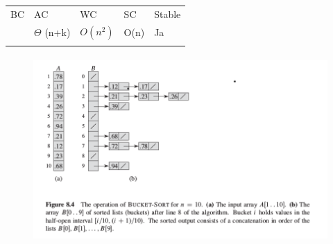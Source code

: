 \documentclass[12pt]{report}
\begin{document}
\begin{table}[H]
 			\centering
\begin{tabular}{p{1.36in}p{1.35in}p{1.07in}p{0.87in}p{1.03in}}
\hline
\multicolumn{1}{p{1.36in}}{{\fontsize{13pt}{15.6pt}\selectfont BC}} & 
\multicolumn{1}{p{1.35in}}{{\fontsize{13pt}{15.6pt}\selectfont AC}} & 
\multicolumn{1}{p{1.07in}}{{\fontsize{13pt}{15.6pt}\selectfont WC}} & 
\multicolumn{1}{p{0.87in}}{{\fontsize{13pt}{15.6pt}\selectfont SC}} & 
\multicolumn{1}{p{1.03in}}{{\fontsize{13pt}{15.6pt}\selectfont Stable}} \\
\hhline{-----}
\multicolumn{1}{p{1.36in}}{{\fontsize{14pt}{16.8pt}\selectfont $ \Omega $ (n+k)}} & 
\multicolumn{1}{p{1.35in}}{{\fontsize{14pt}{16.8pt}\selectfont $ \Theta $ (n+k)}} & 
\multicolumn{1}{p{1.07in}}{ \( O \left( n^{2} \right)  \) } & 
\multicolumn{1}{p{0.87in}}{{\fontsize{14pt}{16.8pt}\selectfont O(n)}} & 
\multicolumn{1}{p{1.03in}}{{\fontsize{13pt}{15.6pt}\selectfont Ja}} \\
\hhline{-----}

\end{tabular}
 \end{table}




\vspace{\baselineskip}



\begin{figure}[H]
\advance\leftskip 2.42in		\includegraphics[width=4.72in,height=2.8in]{./media/image38.png}
\end{figure}


\end{document}
